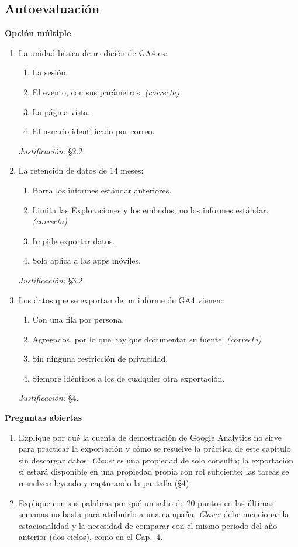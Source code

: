\subsection*{Autoevaluación}

\textbf{Opción múltiple}

\begin{enumerate}
  \item La unidad básica de medición de GA4 es:
  \begin{enumerate}
    \item[a)] La sesión.
    \item[b)] El evento, con sus parámetros. \textit{(correcta)}
    \item[c)] La página vista.
    \item[d)] El usuario identificado por correo.
  \end{enumerate}
  \textit{Justificación:} §2.2.

  \item La retención de datos de 14 meses:
  \begin{enumerate}
    \item[a)] Borra los informes estándar anteriores.
    \item[b)] Limita las Exploraciones y los embudos, no los informes estándar. \textit{(correcta)}
    \item[c)] Impide exportar datos.
    \item[d)] Solo aplica a las apps móviles.
  \end{enumerate}
  \textit{Justificación:} §3.2.

  \item Los datos que se exportan de un informe de GA4 vienen:
  \begin{enumerate}
    \item[a)] Con una fila por persona.
    \item[b)] Agregados, por lo que hay que documentar su fuente. \textit{(correcta)}
    \item[c)] Sin ninguna restricción de privacidad.
    \item[d)] Siempre idénticos a los de cualquier otra exportación.
  \end{enumerate}
  \textit{Justificación:} §4.
\end{enumerate}

\textbf{Preguntas abiertas}

\begin{enumerate}
  \item Explique por qué la cuenta de demostración de Google Analytics no
  sirve para practicar la exportación y cómo se resuelve la práctica de este
  capítulo sin descargar datos. \textit{Clave:} es una propiedad de solo
  consulta; la exportación sí estará disponible en una propiedad propia con
  rol suficiente; las tareas se resuelven leyendo y capturando la pantalla
  (§4).
  \item Explique con sus palabras por qué un salto de 20 puntos en las
  últimas semanas no basta para atribuirlo a una campaña. \textit{Clave:}
  debe mencionar la estacionalidad y la necesidad de comparar con el mismo
  periodo del año anterior (dos ciclos), como en el Cap.~4.
\end{enumerate}


